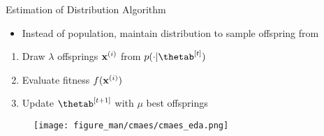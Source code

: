 \documentclass[11pt,compress,t,notes=noshow, xcolor=table]{beamer}
\begin{document}
\begin{frame}{Estimation of Distribution Algorithm}

\begin{minipage}{0.62\textwidth}
\begin{itemize}
    \item Instead of population, maintain distribution to sample offspring from
\end{itemize}

\vspace{\baselineskip}

\begin{enumerate}
    \item Draw $\lambda$ offsprings $\mathbf{x}^{(i)}$ from $p(\cdot|\thetab^{[t]})$
    \item Evaluate fitness $f(\mathbf{x}^{(i)})$ 
    \item Update $\thetab^{[t+1]}$ with $\mu$ best offsprings
\end{enumerate}

\end{minipage}\hfill
\begin{minipage}{0.35\textwidth}\raggedleft
\begin{figure}
  \texttt{[image: figure\_man/cmaes/cmaes\_eda.png]}
\end{figure}
\end{minipage}

\end{frame}




\end{document}
